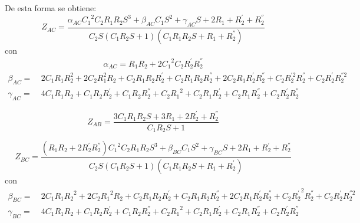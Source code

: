 De esta forma se obtiene:
\begin{equation*}
	Z_{AC} =  \frac{\alpha_{AC} {C_{1}}^{2} C_2 R_{1} R_{2} S^{3} + \beta_{AC} C_1 S^{2}
		+ \gamma_{AC} S + 2 R_1 + R_{2}^{'} + R_{2}^{''}}{
		 C_2 S \left( C_1 R_{2} S + 1 \right)
		\left(C_1 R_1 R_{2} S + R_1 + R_{2}^{''}\right)}
\end{equation*}
con
\begin{equation*}
\begin{split}
	\alpha_{AC} = R_{1} R_{2} + 2 {C_{1}}^{2} C_2 R_{2}^{'} R_{2}^{''}
\end{split}
\end{equation*}
\begin{equation*}
\begin{split}
	\beta_{AC} =\ & 2 C_{1} R_1 R_{2}^{2} + 2 C_2 R_{1}^{2} R_{2} + C_2 R_1 R_{2} R_{2}^{'} +
		C_2 R_1 R_{2} R_{2}^{''} + 2 C_2 R_1 R_{2}^{'} R_{2}^{''} + C_2 R_{2}^{'2} R_{2}^{''} + C_2 R_{2}^{'} R_{2}^{''2}\\
	\gamma_{AC} =\ & 4 C_1 R_1 R_{2} + C_1 R_{2} R_{2}^{'} + C_1 R_{2} R_{2}^{''} +
		C_2 {R_{1}}^{2} + C_2 R_1 R_{2}^{'} + C_2 R_1 R_{2}^{''} + C_2 R_{2}^{'} R_{2}^{''}
\end{split}
\end{equation*}

\begin{equation*}
	Z_{AB} = \frac{3 C_1 R_1 R_{2} S + 3 R_1 + 2 R_{2}^{'} + R_{2}^{''}}{C_1 R_{2} S + 1}
\end{equation*}

\begin{equation*}
	Z_{BC} =
	\frac{ \left( R_1 R_{2} + 2 R_{2}^{'} R_{2}^{''} \right ){C_{1}}^{2} C_2 R_1 R_{2} S^{3} +
	\beta_{BC} C_1 S^{2} + \gamma_{BC} S + 2 R_1 + R_{2}^{'} + R_{2}^{''}}
	{C_2 S \left(C_1 R_{2} S + 1\right) \left(C_1 R_1 R_{2} S + R_1 + R_{2}^{'} \right)}
\end{equation*}
con
\begin{equation*}
\begin{split}
	\beta_{BC} =\ & 2 C_1 R_1 {R_{2}}^{2} + 2C_2 {R_{1}}^{2} R_{2} + C_2 R_1 R_{2} R_{2}^{'} + C_2 R_1 R_{2} R_{2}^{''} + 2 C_2 R_1 R_{2}^{'} R_{2}^{''} + 
	C_2 {R_{2}^{'}}^2 R_{2}^{''} + C_2 R_{2}^{'} R_{2}^{''2}\\
	\gamma_{BC} =\ & 4 C_1 R_1 R_{2} + C_1 R_{2} R_{2}^{'} + C_1 R_{2} R_{2}^{''} +
	C_2 {R_{1}}^{2} + C_2 R_1 R_{2}^{'} + C_2 R_1 R_{2}^{''} +
	C_2 R_{2}^{'} R_{2}^{''} 
\end{split}
\end{equation*}

